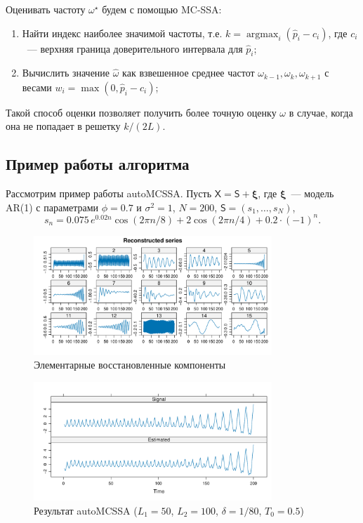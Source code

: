 \documentclass[specialist,
substylefile = spbu_report.rtx,
subf,href,colorlinks=true, 12pt]{disser}
\theoremstyle{definition}
\begin{document}
Оценивать частоту $\omega^\star$ будем с помощью MC-SSA:
\begin{enumerate}
    \item Найти индекс наиболее значимой частоты, т.е. $k=\operatorname{argmax}_i(\widehat{p}_i-c_i)$, где $c_i$~--- верхняя граница доверительного интервала для $\widehat{p}_i$;
    \item Вычислить значение $\hat\omega$ как взвешенное среднее частот $\omega_{k-1}, \omega_k,\omega_{k+1}$ с весами $w_i=\max(0, \widehat{p}_i-c_i)$;
\end{enumerate}
Такой способ оценки позволяет получить более точную оценку $\omega$ в случае, когда она не попадает в решетку $k/(2L)$.

\subsection{Пример работы алгоритма}

Рассмотрим пример работы autoMCSSA. Пусть $\mathsf{X}=\mathsf{S}+\bm{\xi}$, где $\bm\xi$~--- модель AR(1) с параметрами $\phi=0.7$ и $\sigma^2=1$, $N=200$, $\mathsf{S}=(s_1,\ldots, s_N)$,
\[
s_n=0.075\, e^{0.02n}\cos(2\pi n/8) + 2\cos(2\pi n / 4) + 0.2\cdot(-1)^n.
\]

\begin{figure}[!h]
    \centering
    \includegraphics[width=0.8\textwidth]{img/reconstructed_ts.pdf}
    \caption{Элементарные восстановленные компоненты}
    \label{fig:reconstructed_ts}
\end{figure}

\begin{figure}[!h]
    \centering
    \includegraphics[width=0.8\textwidth]{img/auto_mcssa_result.pdf}
    \caption{Результат autoMCSSA ($L_1=50$, $L_2=100$, $\delta=1/80$, $T_0=0.5$)}
    \label{fig:autoMCSSA_res}
\end{figure}
\end{document}
